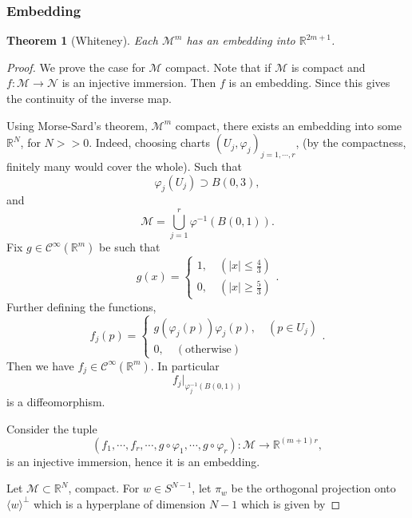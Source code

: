 \documentclass[8pt]{article}
\newtheorem{theorem}{Theorem} [section]
\newcommand{\R}[0]{\mathbb{R}}
\newcommand{\M}[0]{\mathcal{M}}
\newcommand{\maniN}[0]{\mathcal{N}}
\begin{document}
\subsubsection{Embedding}
\begin{theorem}[Whiteney]
  Each $\M^m$ has an embedding into $\R^{2m+1}$. 
\end{theorem}
\begin{proof}
  We prove the case for $\M$ compact. Note that if $\M$ is compact and $f:\M\to\maniN$ is an injective immersion. Then $f$ is an embedding. Since this gives the continuity of the inverse map. 
  \par Using Morse-Sard's theorem, $\M^m$ compact, there exists an embedding into some $\R^N$, for $N>>0$. Indeed, choosing charts $(U_j,\varphi_j)_{j=1,\cdots,r}$, (by the compactness, finitely many would cover the whole). Such that 
  \begin{equation*}
    \varphi_j(U_j)\supset B(0,3),
  \end{equation*}
  and
  \begin{equation*}
    \M = \bigcup_{j=1}^r\varphi^{-1}(B(0,1)).
  \end{equation*}
  Fix $g\in\mathcal{C}^\infty (\R^m)$ be such that 
  \begin{equation*}
    g(x) = \begin{cases}
      1,\quad (\vert x\vert\leq{\frac 4 3})\\
      0,\quad (\vert x\vert\geq{\frac 5 3})
    \end{cases}.
  \end{equation*}
  Further defining the functions,
  \begin{equation*}
    f_j(p) = \begin{cases}
      g(\varphi_j(p))\varphi_j(p),\quad (p\in U_j)\\
      0,\quad(\text{otherwise})
    \end{cases}.
  \end{equation*}
  Then we have $f_j\in\mathcal{C}^\infty(\R^m)$. In particular 
  \begin{equation*}
    f_j|_{\varphi_j^{-1}(B(0,1))}
  \end{equation*}
  is a diffeomorphism.
  \par Consider the tuple 
  \begin{equation*}
    (f_1,\cdots,f_r,\cdots,g\circ\varphi_1,\cdots,g\circ\varphi_r) : \M\to\R^{(m+1)r},
  \end{equation*}
  is an injective immersion, hence it is an embedding.
  \par Let $\M\subset\R^N$, compact. For $w\in S^{N-1}$, let $\pi_w$ be the orthogonal projection onto $\langle w\rangle^\perp$ which is a hyperplane of dimension $N-1$ which is given by 

\end{proof}
\end{document}
